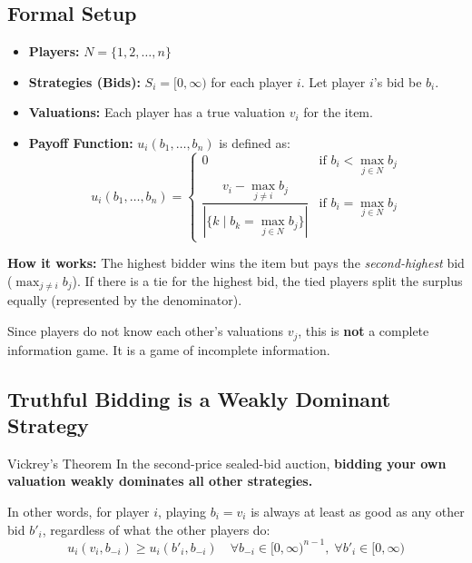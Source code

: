 \documentclass[12pt, a4paper]{article}
\begin{document}
\subsection{Formal Setup}
\begin{itemize}
    \item \textbf{Players:} $N = \{1, 2, \dots, n\}$
    \item \textbf{Strategies (Bids):} $S_i = [0, \infty)$ for each player $i$. Let player $i$'s bid be $b_i$.
    \item \textbf{Valuations:} Each player has a true valuation $v_i$ for the item.
    \item \textbf{Payoff Function:} $u_i(b_1, \dots, b_n)$ is defined as:
    \[
    u_i(b_1, \dots, b_n) = 
    \begin{cases}
      0 & \text{if } b_i < \max_{j \in N} b_j \\[8pt]
      \dfrac{v_i - \max_{j \neq i} b_j}{\left|\{k \mid b_k = \max_{j \in N} b_j\}\right|} & \text{if } b_i = \max_{j \in N} b_j
    \end{cases}
    \]
\end{itemize}

\begin{intubox}
  \textbf{How it works:}
  The highest bidder wins the item but pays the \emph{second-highest} bid ($\max_{j \neq i} b_j$). If there is a tie for the highest bid, the tied players split the surplus equally (represented by the denominator).
\end{intubox}

\begin{notebox}
  Since players do not know each other's valuations $v_j$, this is \textbf{not} a complete information game. It is a game of incomplete information.
\end{notebox}

\subsection{Truthful Bidding is a Weakly Dominant Strategy}

\begin{thmbox}{Vickrey's Theorem}
  In the second-price sealed-bid auction, \textbf{bidding your own valuation weakly dominates all other strategies.}
\end{thmbox}

In other words, for player $i$, playing $b_i = v_i$ is always at least as good as any other bid $b'_i$, regardless of what the other players do:
\[
  u_i(v_i, b_{-i}) \geq u_i(b'_i, b_{-i}) \quad \forall b_{-i} \in [0, \infty)^{n-1}, \; \forall b'_i \in [0, \infty)
\]
\end{document}

